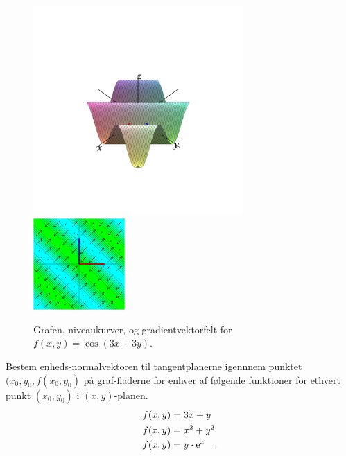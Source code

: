 \begin{figure}[ht]
\centerline{\includegraphics[height=80mm]{plotSurfCosXplusY.pdf} \quad \includegraphics[height=35mm]{plotGradCosXplusY.pdf}}
\begin{center}
\caption{Grafen, niveaukurver, og gradientvektorfelt for $f(x,y) = \cos(3x+3y)$.} \label{figCosPlusSin}
\end{center}
\end{figure}



\begin{exercise}
Bestem enheds-normalvektoren til tangentplanerne igennnem punktet $(x_{0}, y_{0}, f(x_{0}, y_{0})$ på graf-fladerne for enhver af følgende funktioner for ethvert punkt $(x_{0}, y_{0})$ i $(x,y)$-planen.
\begin{equation}
\begin{aligned}
  f(x,y) &= 3x + y\\
  f(x,y) &= x^{2} + y^{2} \\
  f(x,y) &= y\cdot\mathrm{e}^{x} \quad.
\end{aligned}
\end{equation}
\end{exercise}


